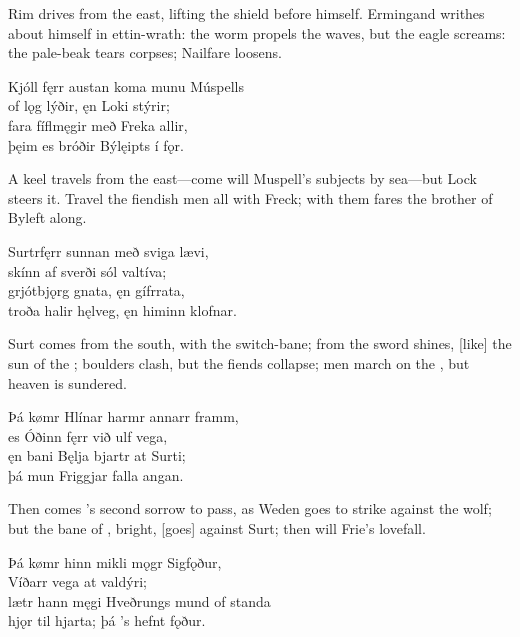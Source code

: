 \bvb Rim drives from the east, lifting the shield before himself. Ermingand writhes about himself in ettin-wrath: the worm propels the waves, but the eagle screams: the pale-beak tears corpses; Nailfare loosens.\evb

\bva Kjóll fęrr austan \hld koma munu Múspells \\%
of lǫg lýðir, \hld ęn Loki stýrir; \\%
fara fíflmęgir \hld með Freka allir, \\%
þęim es bróðir \hld Býlęipts í fǫr.\eva

\bvb A keel travels from the east—come will Muspell’s subjects by sea—but Lock steers it. Travel the fiendish men all with Freck; with them fares the brother of Byleft along.\evb

\bva Surtr\footnotemark[1] fęrr sunnan \hld með sviga lævi, \\%
skínn af sverði \hld sól valtíva; \\%
grjótbjǫrg gnata, \hld ęn gífr\footnotemark[2] rata, \\%
troða halir hęlveg, \hld ęn himinn klofnar.\eva
{}

\bvb Surt comes from the south, with the switch-bane\footnotemark[1]; from the sword shines, [like] the sun of the ; boulders clash, but the fiends collapse; men march on the , but heaven is sundered.\footnotemark[2]\evb
{}

\bva Þá kømr Hlínar \hld harmr annarr framm, \\%
es Óðinn fęrr \hld við ulf vega, \\%
ęn bani Bęlja \hld bjartr at Surti; \\%
þá mun Friggjar \hld falla angan.\eva

\bvb Then comes ’s second sorrow to pass, as Weden goes to strike against the wolf; but the bane of \footnotemark[1], bright, [goes] against Surt; then will Frie’s love\footnotemark[2] fall.\evb
{}

\bva Þá kømr hinn mikli \hld mǫgr Sigfǫður, \\%
Víðarr vega \hld at valdýri; \\%
lætr hann męgi Hveðrungs \hld mund of standa \\%
hjǫr til hjarta; \hld þá ’s hefnt fǫður.\eva

